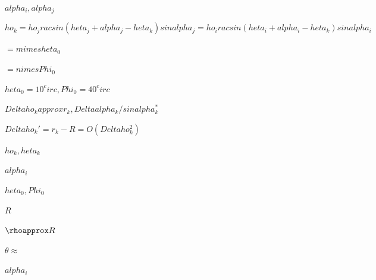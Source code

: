 
$alpha_i,alpha_j$

$$ho_k=
ho_jrac{sin(	heta_j+alpha_j-	heta_k)}{sinalpha_j}=
ho_irac{sin(	heta_i+alpha_i-	heta_k)}{sinalpha_i}$$

$=m	imes	heta_0$

$=n	imesPhi_0$

$heta_0=10^circ,Phi_0=40^circ$

$Delta
ho_kapprox r_k,Deltaalpha_k/sinalpha_k^*$

$Delta
ho_k'=r_k-R=O(Delta
ho_k^2)$

$ho_k,	heta_k$

$alpha_i$

$heta_0,Phi_0$

$R$

$\rhoapprox R$

$\theta\approx$

$alpha_i$
